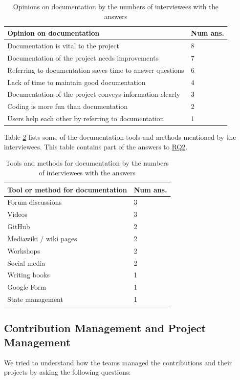 \documentclass[preprint,12pt,authoryear]{elsarticle}
\begin{document}
\begin{table}[ht]
\centering
\begin{tabular}{ll}
\hline
Opinion on documentation & Num ans. \\ \hline
Documentation is vital to the project& 8 \\
Documentation of the project needs improvements & 7 \\
Referring to documentation saves time to answer questions & 6 \\
Lack of time to maintain good documentation & 4 \\
Documentation of the project conveys information clearly & 3 \\
Coding is more fun than documentation & 2 \\
Users help each other by referring to documentation & 1 \\ \hline
\end{tabular}
\caption{\label{tab_opinion_doc}Opinions on documentation by the numbers of
interviewees with the answers}
\end{table}

Table \ref{tab_doc_tools} lists some of the documentation tools and methods
mentioned by the interviewees. This table contains part of the answers to
\hyperlink{rq2}{RQ2}.

\begin{table}[ht]
\centering
\begin{tabular}{ll}
\hline
Tool or method for documentation & Num ans. \\ \hline
Forum discussions & 3 \\
Videos & 3 \\
GitHub & 2 \\
Mediawiki / wiki pages & 2 \\
Workshops & 2 \\
Social media & 2 \\
Writing books & 1 \\
Google Form & 1 \\
State management & 1 \\ \hline
\end{tabular}
\caption{\label{tab_doc_tools}Tools and methods for documentation by the numbers
of interviewees with the answers}
\end{table}

\subsection{Contribution Management and Project Management}
\label{sec_contribution_pm}
We tried to understand how the teams managed the contributions and their
projects by asking the following questions:
\end{document}
